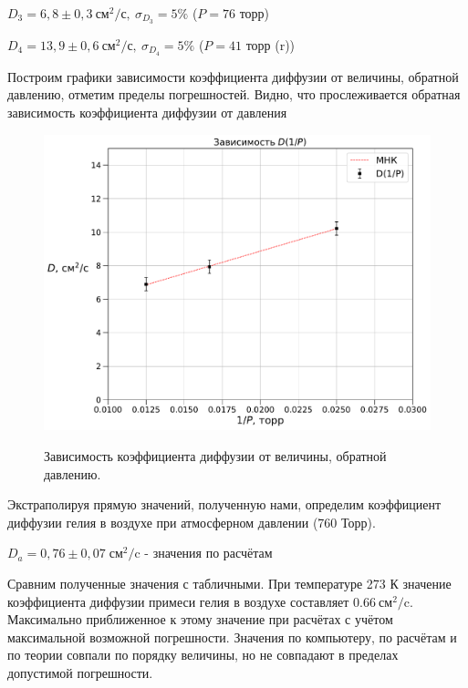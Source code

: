 \documentclass[a4paper, 12pt]{article}
\begin{document}
\begin{center}
{\begin{center}
$\displaystyle     D_3 = 6,8 \pm 0,3\  \mbox{см}^2/\mbox{с},\  \sigma_{D_3} = 5\%$ \; ($P = 76$ торр)
\break

$\displaystyle     D_4 = 13,9 \pm 0,6\  \mbox{см}^2/\mbox{с},\  \sigma_{D_4} = 5\%$ \; ($P = 41$ торр (r))
\break

Построим графики зависимости коэффициента диффузии от величины, обратной давлению, отметим пределы погрешностей. Видно, что прослеживается обратная зависимость коэффициента диффузии от давления
\begin{figure}[H]
    \centering
    \begin{center}
    \caption{Зависимость коэффициента диффузии от величины, обратной давлению.}
    \end{center}
    \includegraphics[scale=0.6]{d(p).pdf}
    \label{fig:vac}
\end{figure} 

Экстраполируя прямую значений, полученную нами, определим коэффициент диффузии гелия в воздухе при атмосферном давлении (760 Торр).\\
\begin{center}
$\displaystyle D_a = 0,76 \pm 0,07 \; \mbox{см}^2/$c - значения по расчётам \break

\end{center}

Сравним полученные значения с табличными. При температуре 273 К значение коэффициента диффузии примеси гелия в воздухе составляет $0.66 \ \mbox{см}^2/$c. Максимально приближенное к этому значение при расчётах с учётом максимальной возможной погрешности. Значения по компьютеру, по расчётам и по теории совпали по порядку величины, но не совпадают в пределах допустимой погрешности. 


\end{center}}
\end{center}
\end{document}
